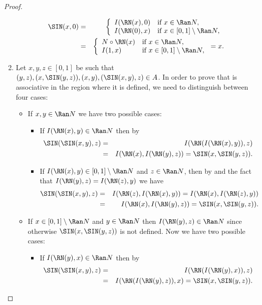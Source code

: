 \begin{proof}
\begin{enumerate}[label=(\roman*)]
\begin{eqnarray*}
		\SIN(x,0)
		&=&
		\left\{ \begin{array}{ll}
			I(\RN(x),0) &   \text{if }   x \in \Ran N, \\
			I(\RN(0),x) & \text{if } x \in [0,1] \setminus \Ran N,
		\end{array} \right. \\
		&=&
		\left\{ \begin{array}{ll}
		N \circ \RN(x) &   \text{if }   x \in \Ran N, \\
		I(1,x) & \text{if } x \in [0,1] \setminus \Ran N,
	\end{array} \right.
		=x.
		\end{eqnarray*}
		\item Let $x,y,z \in [0,1]$ be such that $(y,z), (x, \SIN(y,z)), (x,y), (\SIN(x,y),z) \in A$. In order to prove that \SIN is associative in the region where it is defined,  we need to distinguish between four cases:
		\begin{itemize}
			\item If $x,y \in \Ran N$  we have two possible cases: 
			\begin{itemize}
				\item If $I(\RN(x),y) \in \Ran N$ then by \Rtwo
				\begin{eqnarray*}
				\SIN(\SIN(x,y),z) &=& I(\RN(I(\RN(x),y)),z)\\
				& = & I(\RN(x),I(\RN(y),z)) =\SIN(x,\SIN(y,z)).
				\end{eqnarray*}
				\item If $I(\RN(x),y) \in [0,1] \setminus \Ran N$ and $z \in \Ran N$, then by \EP and the fact that $I(\RN(y),z) = I(\RN(z),y)$ we have
				\begin{eqnarray*}
					\SIN(\SIN(x,y),z) &=& I(\RN(z),I(\RN(x),y)) = I(\RN(x),I(\RN(z),y)) \\
					&=& I(\RN(x),I(\RN(y),z)) = \SIN (x,\SIN(y,z)).
				\end{eqnarray*}
			\end{itemize}
			\item If $x \in [0,1] \setminus \Ran N$ and $y \in \Ran N$ then $I(\RN(y),z) \in \Ran N$ since otherwise $\SIN(x,\SIN(y,z))$ is not defined. Now we have two possible cases:
			\begin{itemize}
				\item If $I(\RN(y),x) \in \Ran N$ then by \Rone
				\begin{eqnarray*}
				\SIN(\SIN(x,y),z) &=& I(\RN(I(\RN(y),x)),z)\\
				 &=& I(\RN(I(\RN(y),z)),x) = \SIN(x,\SIN(y,z)).

\end{eqnarray*}
\end{itemize}
\end{itemize}
\end{enumerate}
\end{proof}
